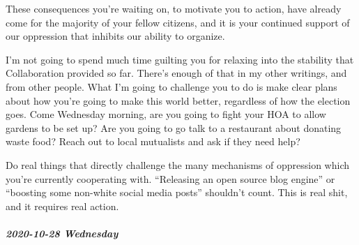 \documentclass[11pt]{article}
\begin{document}
\begin{itemize}
These consequences you’re waiting on, to motivate you to action, have already come for the majority of your fellow citizens, and it is your continued support of our oppression that inhibits our ability to organize.

I’m not going to spend much time guilting you for relaxing into the stability that Collaboration provided so far. There’s enough of that in my other writings, and from other people. What I’m going to challenge you to do is make clear plans about how you’re going to make this world better, regardless of how the election goes. Come Wednesday morning, are you going to fight your HOA to allow gardens to be set up? Are you going to go talk to a restaurant about donating waste food? Reach out to local mutualists and ask if they need help?

Do real things that directly challenge the many mechanisms of oppression which you’re currently cooperating with. “Releasing an open source blog engine” or “boosting some non-white social media posts” shouldn’t count. This is real shit, and it requires real action.
\end{itemize}
\subparagraph*{2020-10-28 Wednesday}
\label{sec:orgb3cf209}
\end{document}
